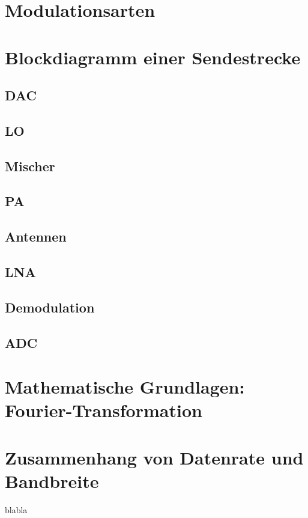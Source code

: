\section{Modulationsarten}

\section{Blockdiagramm einer Sendestrecke}
\subsection{DAC}
\subsection{LO}
\subsection{Mischer} 
\subsection{PA}
\subsection{Antennen}
\subsection{LNA}
\subsection{Demodulation}
\subsection{ADC}
\section{Mathematische Grundlagen: Fourier-Transformation}
\section{Zusammenhang von Datenrate und Bandbreite}
blabla
\clearpage